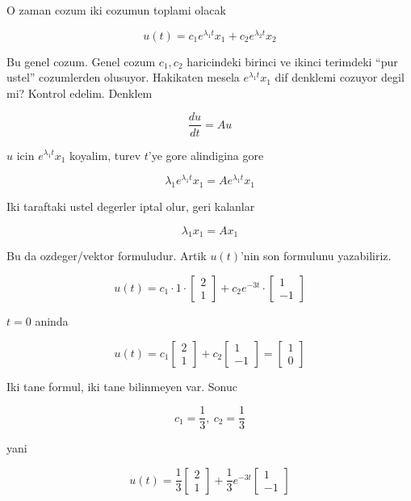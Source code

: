 \documentclass[12pt,fleqn]{article}\usepackage{../common}
\begin{document}
O zaman cozum iki cozumun toplami olacak

\[ u(t) = c_1 e^{\lambda_1 t}x_1 + c_2 e^{\lambda_2 t}x_2\]

Bu genel cozum. Genel cozum $c_1, c_2$ haricindeki birinci ve ikinci
terimdeki ``pur ustel'' cozumlerden olusuyor. Hakikaten mesela $e^{\lambda_1
  t}x_1$ 
dif denklemi cozuyor degil mi? Kontrol edelim. Denklem

\[ \frac{du}{dt} = Au\]

$u$ icin $e^{\lambda_1t}x_1$ koyalim, turev $t$'ye gore alindigina gore

\[ \lambda_1 e^{\lambda_1t}x_1 = A e^{\lambda_1t}x_1\]

Iki taraftaki ustel degerler iptal olur, geri kalanlar

\[ \lambda_1 x_1 = A x_1\]

Bu da ozdeger/vektor formuludur. Artik $u(t)$'nin son formulunu
yazabiliriz. 

\[ u(t) =
c_1 \cdot 1 \cdot 
\left[\begin{array}{c}
2 \\ 1
\end{array}\right]
+
c_2 e^{-3t} \cdot 
\left[\begin{array}{c}
1 \\ -1
\end{array}\right]
 \]

$t=0$ aninda

\[ u(t) =
c_1 
\left[\begin{array}{c}
2 \\ 1
\end{array}\right]
+
c_2 
\left[\begin{array}{c}
1 \\ -1
\end{array}\right] = 
\left[\begin{array}{c}
1 \\ 0
\end{array}\right] 
 \]

Iki tane formul, iki tane bilinmeyen var. Sonuc

\[ c_1 = \frac{1}{3},\ c_2 = \frac{1}{3}\]

yani

\[ u(t) =
\frac{1}{3}
\left[\begin{array}{c}
2 \\ 1
\end{array}\right]
+
\frac{1}{3}  e^{-3t} 
\left[\begin{array}{c}
1 \\ -1
\end{array}\right] 
 \]
\end{document}
